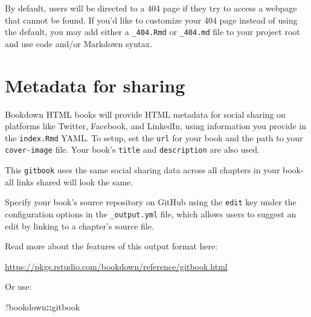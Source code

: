 \documentclass[
]{book}
\newenvironment{Shaded}{\begin{snugshade}}{\end{snugshade}}
\newcommand{\NormalTok}[1]{#1}
\newcommand{\SpecialCharTok}[1]{\textcolor[rgb]{0.81,0.36,0.00}{\textbf{#1}}}
\theoremstyle{definition}
\theoremstyle{definition}
\theoremstyle{definition}
\theoremstyle{definition}
\theoremstyle{remark}
\begin{document}
By default, users will be directed to a 404 page if they try to access a webpage that cannot be found. If you'd like to customize your 404 page instead of using the default, you may add either a \texttt{\_404.Rmd} or \texttt{\_404.md} file to your project root and use code and/or Markdown syntax.

\section{Metadata for sharing}\label{metadata-for-sharing}

Bookdown HTML books will provide HTML metadata for social sharing on platforms like Twitter, Facebook, and LinkedIn, using information you provide in the \texttt{index.Rmd} YAML. To setup, set the \texttt{url} for your book and the path to your \texttt{cover-image} file. Your book's \texttt{title} and \texttt{description} are also used.

This \texttt{gitbook} uses the same social sharing data across all chapters in your book- all links shared will look the same.

Specify your book's source repository on GitHub using the \texttt{edit} key under the configuration options in the \texttt{\_output.yml} file, which allows users to suggest an edit by linking to a chapter's source file.

Read more about the features of this output format here:

\url{https://pkgs.rstudio.com/bookdown/reference/gitbook.html}

Or use:

\begin{Shaded}
\begin{Highlighting}[]
\NormalTok{?bookdown}\SpecialCharTok{::}\NormalTok{gitbook}
\end{Highlighting}
\end{Shaded}


  
\end{document}
